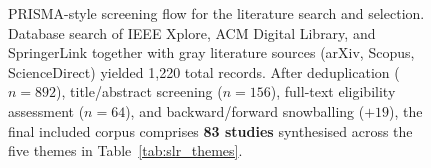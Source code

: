 \documentclass{ieeeaccess}
\begin{document}
\begin{figure}[!t]
{
}%
\caption{PRISMA-style screening flow for the literature search and selection.
Database search of IEEE Xplore, ACM Digital Library, and SpringerLink together with gray literature
sources (arXiv, Scopus, ScienceDirect) yielded 1{,}220 total records.
After deduplication ($n=892$), title/abstract screening ($n=156$), full-text eligibility
assessment ($n=64$), and backward/forward snowballing ($+19$), the final included corpus
comprises \textbf{83 studies} synthesised across the five themes in Table~\ref{tab:slr_themes}.}
\label{fig:prisma_flow}
\end{figure}
\end{document}
